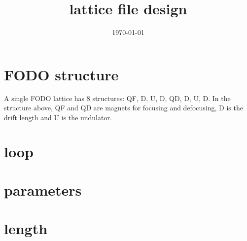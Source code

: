 \documentclass[10pt,CCT]{ctexart}
\begin{document}
\title{lattice file design}
 \date{\today}%

\maketitle
\thispagestyle{empty}

\section{FODO structure}
A single FODO lattice has 8 structures: QF, D, U, D, QD, D, U, D. 
In the structure above, QF and QD are magnets for focusing and defocusing, D is the drift length and U is the undulator. 
 
\section{loop}



\section{parameters}



\section{length}
\end{document}
